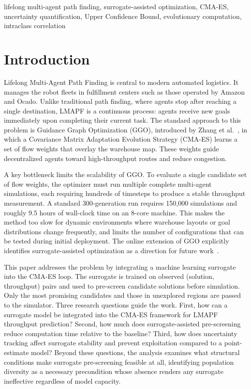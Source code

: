 \documentclass[conference]{IEEEtran}
\begin{document}
\begin{IEEEkeywords}
lifelong multi-agent path finding, surrogate-assisted optimization,
CMA-ES, uncertainty quantification, Upper Confidence Bound, evolutionary computation,
intraclass correlation
\end{IEEEkeywords}



\section{Introduction}

Lifelong Multi-Agent Path Finding is central to modern automated logistics.
It manages the robot fleets in fulfillment centers such as those operated
by Amazon and Ocado. Unlike traditional path finding, where agents stop
after reaching a single destination, LMAPF is a continuous process: agents
receive new goals immediately upon completing their current task. The
standard approach to this problem is Guidance Graph Optimization (GGO),
introduced by Zhang et al.~\cite{zhang2024}, in which a Covariance Matrix
Adaptation Evolution Strategy (CMA-ES) learns a set of flow weights that
overlay the warehouse map. These weights guide decentralized agents toward
high-throughput routes and reduce congestion.

A key bottleneck limits the scalability of GGO. To evaluate a single
candidate set of flow weights, the optimizer must run multiple complete
multi-agent simulations, each requiring hundreds of timesteps to produce a
stable throughput measurement. A standard 300-generation run requires
150,000 simulations and roughly 9.5 hours of wall-clock time on an 8-core
machine. This makes the method too slow for dynamic environments where
warehouse layouts or goal distributions change frequently, and limits the
number of configurations that can be tested during initial deployment.
The online extension of GGO explicitly identifies surrogate-assisted
optimization as a direction for future work~\cite{zang2025}.

This paper addresses the problem by integrating a machine learning
surrogate into the CMA-ES loop. The surrogate is trained on observed
(solution, throughput) pairs and used to pre-screen candidate solutions
before simulation. Only the most promising candidates and those in
unexplored regions are passed to the simulator. Three research questions
guide the work. First, how can a surrogate model be integrated into the
CMA-ES framework for LMAPF throughput prediction? Second, how much does
surrogate-assisted pre-screening reduce computation time relative to the
baseline? Third, how does uncertainty tracking affect surrogate stability
and prevent exploitation compared to a point-estimate model?
Beyond these questions, the analysis examines what structural conditions
make surrogate pre-screening feasible at all, identifying population
diversity as a necessary precondition whose absence renders any surrogate
ineffective regardless of model capacity.
\end{document}
